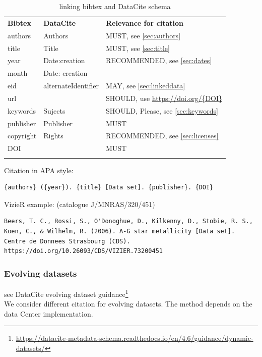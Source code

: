\documentclass[11pt,a4paper]{ivoa}
\begin{document}
\begin{table}[th]
	\begin{tabular}{lll}
		\sptablerule
		\textbf{Bibtex} & \textbf{DataCite} & \textbf{Relevance for citation} \\
		\sptablerule
		\sptablerule
	authors & Authors & MUST, see \ref{sec:authors} \\
	title & Title & MUST, see \ref{sec:title}\\
	year &  Date:creation & RECOMMENDED, see \ref{sec:dates} \\
	month & Date: creation & \\
	eid & alternateIdentifier & MAY, see \ref{sec:linkeddata}\\
	url & & SHOULD, use \url{https://doi.org/{DOI}} \\
	keywords & Sujects & SHOULD, Please, see \ref{sec:keywords} \\
	publisher & Publisher & MUST \\
    copyright & Rights & RECOMMENDED, see \ref{sec:licenses} \\
    DOI & & MUST \\
    \sptablerule
	\end{tabular}%
\caption{\label{tab:astroDOIs1}linking bibtex and DataCite schema}
\end{table}

Citation in APA style:
\begin{verbatim}
{authors} ({year}). {title} [Data set]. {publisher}. {DOI}
\end{verbatim}

VizieR example: (catalogue J/MNRAS/320/451)
\begin{verbatim}
Beers, T. C., Rossi, S., O'Donoghue, D., Kilkenny, D., Stobie, R. S.,
Koen, C., & Wilhelm, R. (2006). A-G star metallicity [Data set]. 
Centre de Donnees Strasbourg (CDS). https://doi.org/10.26093/CDS/VIZIER.73200451
\end{verbatim}

\subsubsection{Evolving datasets}

see DataCite evolving dataset guidance\footnote{\url{https://datacite-metadata-schema.readthedocs.io/en/4.6/guidance/dynamic-datasets/}}\\

We consider different citation for evolving datasets. The method depends on the data Center implementation.
\end{document}
